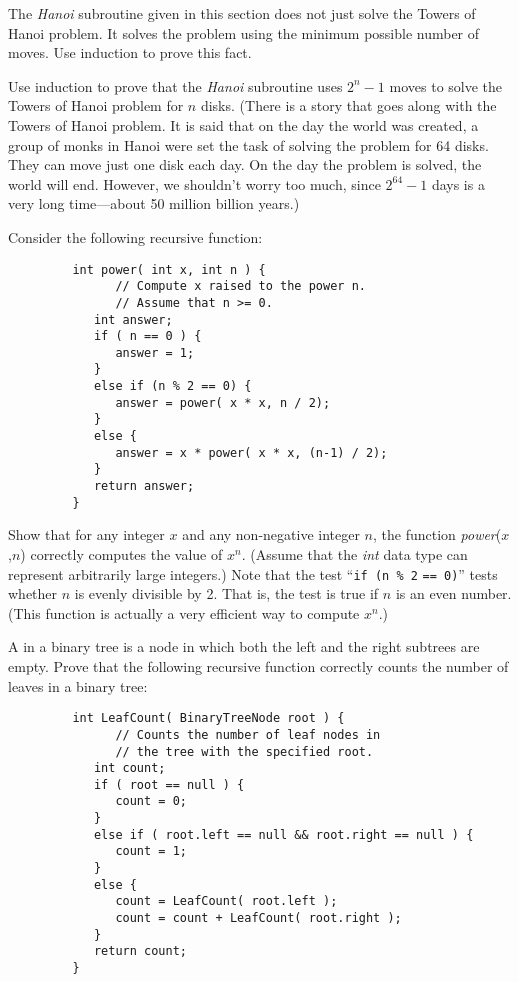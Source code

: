 \begin{exercises}

\problem The \textit{Hanoi} subroutine given in this section does
not just solve the Towers of Hanoi problem.  It solves the
problem using the minimum possible number of moves.  Use induction
to prove this fact.

\problem Use induction to prove that the \textit{Hanoi} subroutine
uses $2^n-1$ moves to solve the Towers of Hanoi problem for $n$ disks.
(There is a story that goes along with the Towers of Hanoi problem.
It is said that on the day the world was created, a group of monks in Hanoi
were set the task of solving the problem for 64 disks.  They can
move just one disk each day.  On the day the problem is solved, 
the world will end.  However, we shouldn't worry too much,
since $2^{64}-1$ days is a very long time---about 50 million billion years.)

\problem Consider the following recursive function:
\begin{verbatim}
         int power( int x, int n ) {
               // Compute x raised to the power n.
               // Assume that n >= 0.
            int answer;
            if ( n == 0 ) {
               answer = 1;
            }
            else if (n % 2 == 0) {
               answer = power( x * x, n / 2);
            }
            else {
               answer = x * power( x * x, (n-1) / 2);
            }
            return answer;
         }
\end{verbatim}
Show that for any integer $x$ and any non-negative integer $n$,
the function \textit{power}($x$,$n$) correctly computes the value
of $x^n$.  (Assume that the \textit{int} data type can represent
arbitrarily large integers.)  Note that the test
``\verb/if (n % 2/ \verb/== 0)/'' tests whether $n$ is evenly divisible by 2.
That is, the test is true if $n$ is an even number.  (This function is
actually a very efficient way to compute $x^n$.)

\problem A  in a binary tree is a node in which 
both the left and the right subtrees are empty.  Prove that
the following recursive function correctly counts the number
of leaves in a binary tree:
\begin{verbatim}
         int LeafCount( BinaryTreeNode root ) {
               // Counts the number of leaf nodes in
               // the tree with the specified root.
            int count;
            if ( root == null ) {
               count = 0;
            }
            else if ( root.left == null && root.right == null ) {
               count = 1;
            }
            else {
               count = LeafCount( root.left );
               count = count + LeafCount( root.right );
            }
            return count;
         }
\end{verbatim}
\smallskip


\end{exercises}
